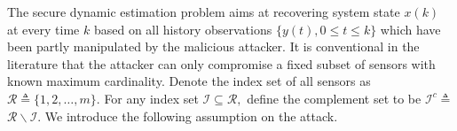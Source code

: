 \documentclass{ieeetrans}   %
\newcommand{\Ic}{{\mathcal{I}}}
\newcommand{\Rc}{{\mathcal{R}}}
\begin{document}
The secure dynamic estimation problem aims at recovering system state $x(k)$ at every time $k$ based on all history observations $\{y(t),0\leq t\leq k\}$ which have been partly manipulated by the malicious attacker.
It is conventional in the literature \cite{FawziTAC2014}\cite{Shoukry2017} that the attacker can only compromise a fixed subset of sensors with known maximum cardinality. 
Denote the index set of all sensors as $\Rc \triangleq\{1,2, \ldots, m\}$. 
For any index set $\Ic \subseteq \Rc,$ define the complement set to be $\Ic^{c} \triangleq$ $\Rc \backslash \Ic$. 
We introduce the following assumption on the attack.
\end{document}
